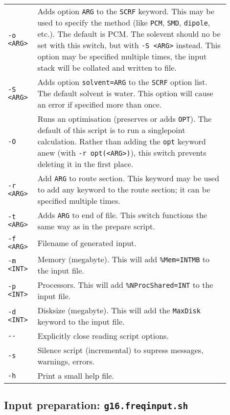 \documentclass[   %
  final,          %
  a4paper         %
]{article}
\begin{document}
\begin{longtable}{p{0.1\linewidth}p{0.8\linewidth}}
  {\lstinline`-o <ARG>`} & Adds option {\lstinline`ARG`} to the \texttt{SCRF} keyword. 
    This may be used to specify the method (like \texttt{PCM}, \texttt{SMD}, \texttt{dipole}, etc.).
    The default is PCM. The solevent should no be set with this switch, 
    but with {\lstinline`-S <ARG>`} instead. 
    This option may be specified multiple times, the input stack will be collated and written to file. \\
  {\lstinline`-S <ARG>`} & Adds option \texttt{solvent={\lstinline`ARG`}} to the \texttt{SCRF} option list. 
    The default solvent is water. This option will cause an error if specified more than once.\\
  {\lstinline`-O`}       & Runs an optimisation (preserves or adds \texttt{OPT}).
    The default of this script is to run a singlepoint calculation. 
    Rather than adding the \texttt{opt} keyword anew (with {\lstinline`-r opt(<ARG>)`}), 
    this switch prevents deleting it in the first place. \\
  {\lstinline`-r <ARG>`} & Add {\lstinline`ARG`} to route section. 
    This keyword may be used to add any keyword to the route section; 
    it can be specified multiple times.\\
  {\lstinline`-t <ARG>`} & Adds {\lstinline`ARG`} to end of file. 
    This switch functions the same way as in the prepare script. \\
  {\lstinline`-f <ARG>`} & Filename of generated input. \\
  {\lstinline`-m <INT>`} & Memory (megabyte). This will add \texttt{\%Mem={\lstinline`INT`}MB} to the input file. \\
  {\lstinline`-p <INT>`} & Processors. This will add \texttt{\%NProcShared={\lstinline`INT`}} to the input file. \\
  {\lstinline`-d <INT>`} & Disksize (megabyte). This will add the \texttt{MaxDisk} keyword to the input file. \\
  {\lstinline`--`}       & Explicitly close reading script options. \\
  {\lstinline`-s`}       & Silence script (incremental) to supress messages, warnings, errors. \\
  {\lstinline`-h`}       & Print a small help file. \\
\end{longtable}

\subsection{Input preparation: \texorpdfstring{{\lstinline`g16.freqinput.sh`}}{g16.freqinput.sh}}
\label{sec:g16.freqinput}
\end{document}
